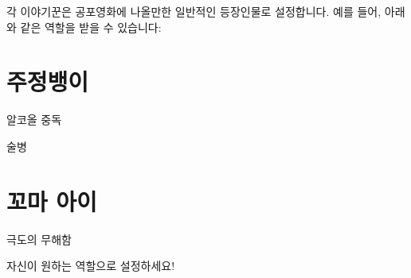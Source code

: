 \documentclass{report}
\begin{document}
	각 이야기꾼은 공포영화에 나올만한 일반적인 등장인물로 설정합니다. 예를 들어, 아래와 같은 역할을 받을 수 있습니다:
	
	\section{주정뱅이}
	
	\begin{lite}{알코올 중독}
	\end{lite}
	
	\begin{lite}{술병}
	\end{lite}
	
	\section{꼬마 아이}
	
	\begin{lite}{극도의 무해함}
	\end{lite}
	
	\bigskip
	
	자신이 원하는 역할으로 설정하세요!
	
\end{document}
